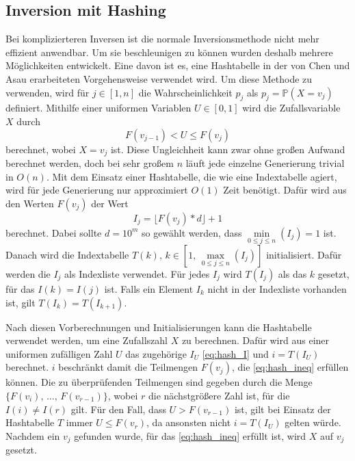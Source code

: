 \subsection{Inversion mit Hashing}
\label{funktion_invhashing}
Bei komplizierteren Inversen ist die normale Inversionsmethode nicht 
mehr effizient anwendbar. Um sie beschleunigen zu können wurden deshalb mehrere 
Möglichkeiten entwickelt. Eine davon ist es, eine Hashtabelle in der von Chen und 
Asau \cite{chen_asau-generating_random_variates-1974} erarbeiteten Vorgehensweise 
verwendet wird. Um diese Methode zu verwenden, wird für $j \in [1, n]$ die 
Wahrscheinlichkeit $p_j$ als $p_j = \mathbb{P}(X=v_j)$ definiert. Mithilfe einer uniformen 
Variablen $U \in [0, 1]$ wird die Zufallsvariable $X$ durch 
\begin{equation}
    F(v_{j-1}) < U \leq F(v_j)
    \label{eq:hash_ineq}
\end{equation}
berechnet, wobei $X = v_j$ ist. Diese Ungleichheit kann zwar ohne großen Aufwand 
berechnet werden, doch bei sehr großem $n$ läuft jede einzelne Generierung trivial 
in $O(n)$. Mit dem Einsatz einer Hashtabelle, die wie eine Indextabelle agiert, 
wird für jede Generierung nur approximiert $O(1)$ Zeit benötigt. Dafür wird aus 
den Werten $F(v_j)$ der Wert
\begin{equation}
     I_j = \lfloor F(v_j) * d \rfloor + 1
     \label{eq:hash_I}
\end{equation}
berechnet. Dabei sollte $d = 10^m$ so gewählt werden, dass $\min\limits_{0\le 
j\le n}(I_j) = 1$ ist. Danach wird die Indextabelle $T(k),\, k \in [1,\, \max
\limits_{0\le j\le n}(I_j)]$ initialisiert. Dafür werden die $I_j$ als Indexliste 
verwendet. Für jedes $I_j$ wird $T(I_j)$ als das $k$ gesetzt, für das $I(k) = 
I(j)$ ist. Falls ein Element $I_k$ nicht in der Indexliste vorhanden ist, gilt 
$T(I_k) = T(I_{k+1})$. 

Nach diesen Vorberechnungen und Initialisierungen kann die Hashtabelle verwendet 
werden, um eine Zufallszahl $X$ zu berechnen. Dafür wird aus einer uniformen 
zufälligen Zahl $U$ das zugehörige $I_U$ \eqref{eq:hash_I} und $i = T(I_U)$ berechnet. $i$ 
beschränkt damit die Teilmengen $F(v_j)$, die \eqref{eq:hash_ineq} erfüllen 
können. Die zu überprüfenden Teilmengen sind gegeben durch die Menge $\{F(v_i),\, \dots,
\, F(v_{r-1})\}$, wobei $r$ die nächstgrößere Zahl ist, für die $I(i) \neq I(r)$ 
gilt. Für den Fall, dass $U > F(v_{r-1})$ ist, gilt bei Einsatz der Hashtabelle 
$T$ immer $U \leq F(v_r)$, da ansonsten nicht $i = T(I_U)$ gelten würde. Nachdem 
ein $v_j$ gefunden wurde, für das \eqref{eq:hash_ineq} erfüllt ist, wird $X$ auf 
$v_j$ gesetzt.

